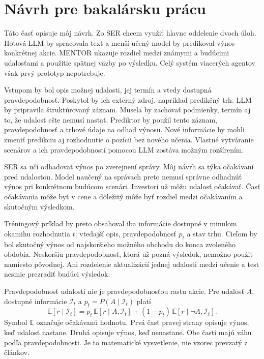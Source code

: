 \section{Návrh pre bakalársku prácu}
Táto časť opisuje môj návrh. Zo SER chcem využiť hlavne oddelenie dvoch úloh. Hotová LLM by spracovala text a menší učený model by predikoval výnos konkrétnej akcie. MENTOR ukazuje rozdiel medzi známymi a budúcimi udalosťami a použitie spätnej väzby po výsledku. Celý systém viacerých agentov však prvý prototyp nepotrebuje.

Vstupom by bol opis možnej udalosti, jej termín a vtedy dostupná pravdepodobnosť. Poskytol by ich externý zdroj, napríklad predikčný trh. LLM by pripravila štruktúrovaný záznam. Musela by zachovať podmienky, termín aj to, že udalosť ešte nemusí nastať. Prediktor by použil tento záznam, pravdepodobnosť a trhové údaje na odhad výnosu. Nové informácie by mohli zmeniť predikciu aj rozhodnutie o pozícii bez nového učenia. Vlastné vytváranie scenárov a ich pravdepodobností pomocou LLM zostáva možným rozšírením.

SER sa učí odhadovať výnos po zverejnení správy. Môj návrh sa týka očakávaní pred udalosťou. Model naučený na správach preto nemusí správne odhadnúť výnos pri konkrétnom budúcom scenári. Investori už môžu udalosť očakávať. Časť očakávania môže byť v cene a dôležitý môže byť rozdiel medzi očakávaním a skutočným výsledkom.

Tréningový príklad by preto obsahoval iba informácie dostupné v minulom okamihu rozhodnutia $t$: vtedajší opis, pravdepodobnosť $p_t$ a stav trhu. Cieľom by bol skutočný výnos od najskoršieho možného obchodu do konca zvoleného obdobia. Neskoršiu pravdepodobnosť, ktorá už pozná výsledok, nemožno použiť namiesto pôvodnej. Ani rozdelenie aktualizácií jednej udalosti medzi učenie a test nesmie prezradiť budúci výsledok.

Pravdepodobnosť udalosti nie je pravdepodobnosťou rastu akcie. Pre udalosť $A$, dostupné informácie $\mathcal I_t$ a $p_t=P(A\mid\mathcal I_t)$ platí
\begin{equation}
\mathbb E[r\mid\mathcal I_t]
=p_t\,\mathbb E[r\mid A,\mathcal I_t]
 +(1-p_t)\,\mathbb E[r\mid\neg A,\mathcal I_t].
\label{eq:expectation}
\end{equation}
Symbol $\mathbb E$ označuje očakávanú hodnotu. Prvá časť pravej strany opisuje výnos, keď udalosť nastane. Druhá opisuje výnos, keď nenastane. Obe časti majú váhu podľa pravdepodobnosti. Je to matematické vysvetlenie, nie vzorec prevzatý z článkov.

